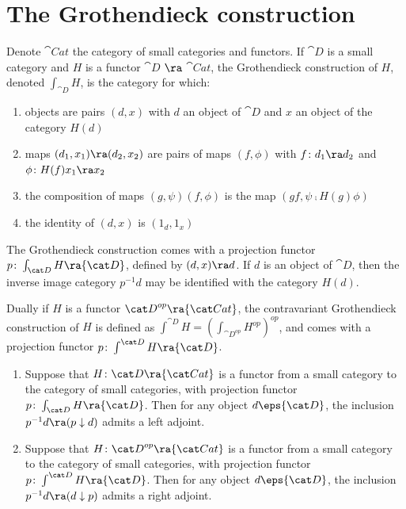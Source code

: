\section{The Grothendieck construction}
\label{sec:grothendieckconstruction}
Denote ${\cat Cat}$ the category of small categories and functors. If ${\cat D}$ is a small category and $H$ is a functor ${\cat D}$ $\ra$ ${\cat Cat}$, the Grothendieck construction of $H$, denoted $\int_{\cat D} H$, is the category for which:
\begin{enumerate}
\item
objects are pairs $(d, x)$ with $d$ an object of ${\cat D}$ and $x$ an object of the category $H(d)$
\item 
maps $(d_1, x_1) \ra (d_2, x_2)$ are pairs of maps $(f, \phi)$ with $f \colon d_1 \ra d_2$ and $\phi \colon H(f)x_1 \ra x_2$
\item 
the composition of maps $(g, \psi)(f, \phi)$ is the map $(gf,  \psi \comp H(g) \phi)$
\item 
the identity of $(d, x)$ is $(1_d, 1_x)$
\end{enumerate}

The Grothendieck construction comes with a projection functor $p \colon \int_{\cat D} H \ra {\cat D}$, defined by $(d, x) \ra d$. If $d$ is an object of ${\cat D}$, then the inverse image category $p^{-1}d$ may be identified with the category $H(d)$. 

Dually if $H$ is a functor ${\cat D}^{op} \ra {\cat Cat}$, the contravariant Grothendieck construction of $H$ is defined as $\int^{\cat D} H = (\int_{{\cat D}^{op}} {H^{op}})^{op}$, and comes with a projection functor $p \colon \int^{\cat D} H \ra {\cat D}$.

\begin{prop}
\label{prop:grothendieckconstructionadjoint}
\mbox{}
\begin{enumerate}
\item
Suppose that $H \colon {\cat D} \ra {\cat Cat}$ is a functor from a small category to the category of small categories, with projection functor $p \colon \int_{\cat D} H \ra {\cat D}$. Then for any object $d \eps {\cat D}$, the inclusion $p^{-1}d \ra (p \downarrow d)$ admits a left adjoint.
\item
Suppose that $H \colon {\cat D}^{op} \ra {\cat Cat}$ is a functor from a small category to the category of small categories, with projection functor $p \colon \int^{\cat D} H \ra {\cat D}$. Then for any object $d \eps {\cat D}$, the inclusion $p^{-1}d \ra (d \downarrow p)$ admits a right adjoint.
\end{enumerate}
\end{prop}

